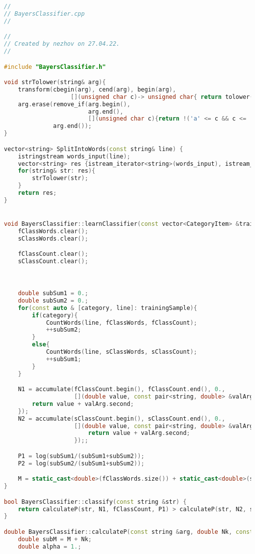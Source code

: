 \begin{lstlisting}[language=C++]
//
// BayersClassifier.cpp
//

//
// Created by nezhov on 27.04.22.
//

#include "BayersClassifier.h"

void strTolower(string& arg){
    transform(cbegin(arg), cend(arg), begin(arg),
                   [](unsigned char c)-> unsigned char{ return tolower(c); });
    arg.erase(remove_if(arg.begin(),
                        arg.end(),
                        [](unsigned char c){return !('a' <= c && c <= 'z');}),
              arg.end());
}

vector<string> SplitIntoWords(const string& line) {
    istringstream words_input(line);
    vector<string> res {istream_iterator<string>(words_input), istream_iterator<string>()};
    for(string& str: res){
        strTolower(str);
    }
    return res;
}


void BayersClassifier::learnClassifier(const vector<CategoryItem> &trainingSample) {
    fClassWords.clear();
    sClassWords.clear();

    fClassCount.clear();
    sClassCount.clear();



    double subSum1 = 0.; 
    double subSum2 = 0.; 
    for(const auto & [category, line]: trainingSample){
        if(category){
            CountWords(line, fClassWords, fClassCount);
            ++subSum2;
        }
        else{
            CountWords(line, sClassWords, sClassCount);
            ++subSum1;
        }
    }

    N1 = accumulate(fClassCount.begin(), fClassCount.end(), 0.,
                    [](double value, const pair<string, double> &valArg){
        return value + valArg.second;
    });
    N2 = accumulate(sClassCount.begin(), sClassCount.end(), 0.,
                    [](double value, const pair<string, double> &valArg){
                        return value + valArg.second;
                    });;

    P1 = log(subSum1/(subSum1+subSum2));
    P2 = log(subSum2/(subSum1+subSum2));

    M = static_cast<double>(fClassWords.size()) + static_cast<double>(sClassWords.size());
}

bool BayersClassifier::classify(const string &str) {
    return calculateP(str, N1, fClassCount, P1) > calculateP(str, N2, sClassCount, P2);
}

double BayersClassifier::calculateP(const string &arg, double Nk, const map<string, double> &ClassCount, double Pq) {
    double subM = M + Nk;
    double alpha = 1.;


\end{lstlisting}
